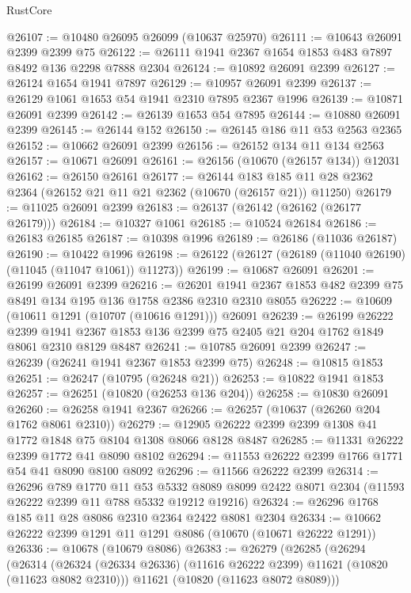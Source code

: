 \begin{lexlean}{RustCore}
\begin{coremodule}
@26107 := @10480 @26095 @26099 (@10637 @25970)
@26111 := @10643 @26091 @2399 @2399 @75
@26122 := @26111 @1941 @2367 @1654 @1853 @483 @7897 @8492 @136 @2298 @7888 @2304
@26124 := @10892 @26091 @2399
@26127 := @26124 @1654 @1941 @7897
@26129 := @10957 @26091 @2399
@26137 := @26129 @1061 @1653 @54 @1941 @2310 @7895 @2367 @1996
@26139 := @10871 @26091 @2399
@26142 := @26139 @1653 @54 @7895
@26144 := @10880 @26091 @2399
@26145 := @26144 @152
@26150 := @26145 @186 @11 @53 @2563 @2365
@26152 := @10662 @26091 @2399
@26156 := @26152 @134 @11 @134 @2563
@26157 := @10671 @26091
@26161 := @26156 (@10670 (@26157 @134)) @12031
@26162 := @26150 @26161
@26177 := @26144
    @183
    @185
    @11
    @28
    @2362
    @2364
    (@26152 @21 @11 @21 @2362 (@10670 (@26157 @21)) @11250)
@26179 := @11025 @26091 @2399
@26183 := @26137 (@26142 (@26162 (@26177 @26179)))
@26184 := @10327 @1061
@26185 := @10524 @26184
@26186 := @26183 @26185
@26187 := @10398 @1996
@26189 := @26186 (@11036 @26187)
@26190 := @10422 @1996
@26198 := @26122 (@26127 (@26189 (@11040 @26190) (@11045 (@11047 @1061)) @11273))
@26199 := @10687 @26091
@26201 := @26199 @26091 @2399
@26216 := @26201 @1941 @2367 @1853 @482 @2399 @75 @8491 @134 @195 @136 @1758 @2386 @2310 @2310 @8055
@26222 := @10609 (@10611 @1291 (@10707 (@10616 @1291))) @26091
@26239 := @26199
    @26222
    @2399
    @1941
    @2367
    @1853
    @136
    @2399
    @75
    @2405
    @21
    @204
    @1762
    @1849
    @8061
    @2310
    @8129
    @8487
@26241 := @10785 @26091 @2399
@26247 := @26239 (@26241 @1941 @2367 @1853 @2399 @75)
@26248 := @10815 @1853
@26251 := @26247 (@10795 (@26248 @21))
@26253 := @10822 @1941 @1853
@26257 := @26251 (@10820 (@26253 @136 @204))
@26258 := @10830 @26091
@26260 := @26258 @1941 @2367
@26266 := @26257 (@10637 (@26260 @204 @1762 @8061 @2310))
@26279 := @12905 @26222 @2399 @2399 @1308 @41 @1772 @1848 @75 @8104 @1308 @8066 @8128 @8487
@26285 := @11331 @26222 @2399 @1772 @41 @8090 @8102
@26294 := @11553 @26222 @2399 @1766 @1771 @54 @41 @8090 @8100 @8092
@26296 := @11566 @26222 @2399
@26314 := @26296
    @789
    @1770
    @11
    @53
    @5332
    @8089
    @8099
    @2422
    @8071
    @2304
    (@11593 @26222 @2399 @11 @788 @5332 @19212 @19216)
@26324 := @26296 @1768 @185 @11 @28 @8086 @2310 @2364 @2422 @8081 @2304
@26334 := @10662 @26222 @2399 @1291 @11 @1291 @8086 (@10670 (@10671 @26222 @1291))
@26336 := @10678 (@10679 @8086)
@26383 := @26279
    (@26285
      (@26294
        (@26314
          (@26324 (@26334 @26336) (@11616 @26222 @2399) @11621 (@10820 (@11623 @8082 @2310)))
          @11621
          (@10820 (@11623 @8072 @8089)))

\end{coremodule}
\end{lexlean}
